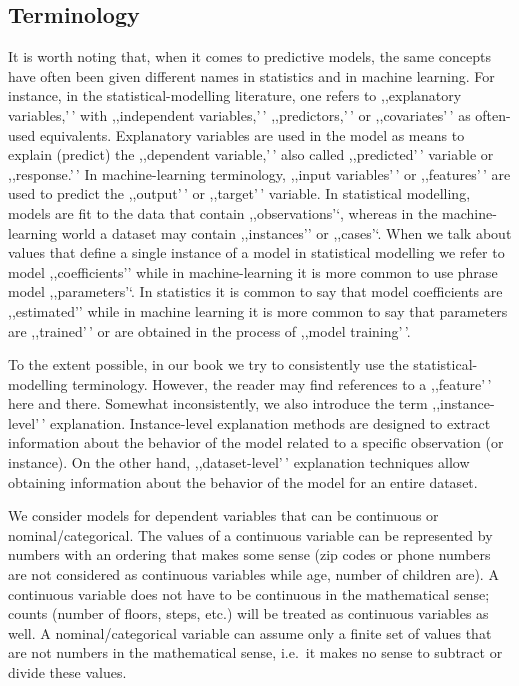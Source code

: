 \documentclass[12pt,]{krantz}
\begin{document}
\hypertarget{terminology}{%
\subsection{Terminology}\label{terminology}}

It is worth noting that, when it comes to predictive models, the same concepts have often been given different names in statistics and in machine learning. For instance, in the statistical-modelling literature, one refers to ,,explanatory variables,'\,' with ,,independent variables,'\,' ,,predictors,'\,' or ,,covariates'\,' as often-used equivalents. Explanatory variables are used in the model as means to explain (predict) the ,,dependent variable,'\,' also called ,,predicted'\,' variable or ,,response.'\,' In machine-learning terminology, ,,input variables'\,' or ,,features'\,' are used to predict the ,,output'\,' or ,,target'\,' variable. In statistical modelling, models are fit to the data that contain ,,observations'`, whereas in the machine-learning world a dataset may contain ,,instances'' or ,,cases'`. When we talk about values that define a single instance of a model in statistical modelling we refer to model ,,coefficients'' while in machine-learning it is more common to use phrase model ,,parameters'`. In statistics it is common to say that model coefficients are ,,estimated'' while in machine learning it is more common to say that parameters are ,,trained'\,' or are obtained in the process of ,,model training'\,'.

To the extent possible, in our book we try to consistently use the statistical-modelling terminology. However, the reader may find references to a ,,feature'\,' here and there. Somewhat inconsistently, we also introduce the term ,,instance-level'\,' explanation. Instance-level explanation methods are designed to extract information about the behavior of the model related to a specific observation (or instance). On the other hand, ,,dataset-level'\,' explanation techniques allow obtaining information about the behavior of the model for an entire dataset.

We consider models for dependent variables that can be continuous or nominal/categorical. The values of a continuous variable can be represented by numbers with an ordering that makes some sense (zip codes or phone numbers are not considered as continuous variables while age, number of children are). A continuous variable does not have to be continuous in the mathematical sense; counts (number of floors, steps, etc.) will be treated as continuous variables as well. A nominal/categorical variable can assume only a finite set of values that are not numbers in the mathematical sense, i.e.~it makes no sense to subtract or divide these values.
\end{document}
